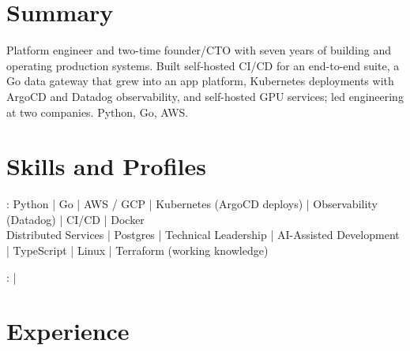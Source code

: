 \documentclass[print]{jack-resume}
\begin{document}
\pagecolor{darkmodeBackground}


\begin{minipage}[t][1cm][t]{.03\textwidth}
    \hfill
\end{minipage}

\section{Summary}
Platform engineer and two-time founder/CTO with seven years of building and operating production systems. Built self-hosted CI/CD for an end-to-end suite, a Go data gateway that grew into an app platform, Kubernetes deployments with ArgoCD and Datadog observability, and self-hosted GPU services; led engineering at two companies. Python, Go, AWS.
\sectionsep

\section{Skills and Profiles}
:
Python \hfill | \hfill
Go \hfill | \hfill
AWS / GCP \hfill | \hfill
Kubernetes (ArgoCD deploys) \hfill | \hfill
Observability (Datadog) \hfill | \hfill
CI/CD \hfill | \hfill
Docker \\
\hspace{1.0cm} Distributed Services \hfill | \hfill
Postgres \hfill | \hfill
Technical Leadership \hfill | \hfill
AI-Assisted Development \hfill | \hfill
TypeScript \hfill | \hfill
Linux \hfill | \hfill
Terraform (working knowledge) \\

\raggedright{
    :
      \href{https://www.linkedin.com/in/jack-sturtevant/}{ \ExternalLink} |
     \href{https://github.com/jacksturt}{ \ExternalLink}}

\section{Experience}
\end{document}
